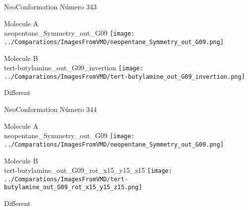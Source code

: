  \newpage

\vtab[-2cm]
\begin{center}
{\large NeoConformation \tab Número 343}
\end{center}
\begin{multicols}{2}
\begin{center}
Molecule A \\ 
neopentane\_Symmetry\_out\_G09
\texttt{[image: ../Comparations/ImagesFromVMD/neopentane\_Symmetry\_out\_G09.png]}
\\
\vtab

\columnbreak
Molecule B \\ 
tert-butylamine\_out\_G09\_invertion
\texttt{[image: ../Comparations/ImagesFromVMD/tert-butylamine\_out\_G09\_invertion.png]}
\\
\vtab


\end{center}
\end{multicols}
\begin{center}
\vtab
\vtab
\textcolor{NavyBlue}{\Large Different}
\end{center}

 \newpage

\vtab[-2cm]
\begin{center}
{\large NeoConformation \tab Número 344}
\end{center}
\begin{multicols}{2}
\begin{center}
Molecule A \\ 
neopentane\_Symmetry\_out\_G09
\texttt{[image: ../Comparations/ImagesFromVMD/neopentane\_Symmetry\_out\_G09.png]}
\\
\vtab

\columnbreak
Molecule B \\ 
tert-butylamine\_out\_G09\_rot\_x15\_y15\_z15
\texttt{[image: ../Comparations/ImagesFromVMD/tert-butylamine\_out\_G09\_rot\_x15\_y15\_z15.png]}
\\
\vtab


\end{center}
\end{multicols}
\begin{center}
\vtab
\vtab
\textcolor{NavyBlue}{\Large Different}
\end{center}

 \newpage

